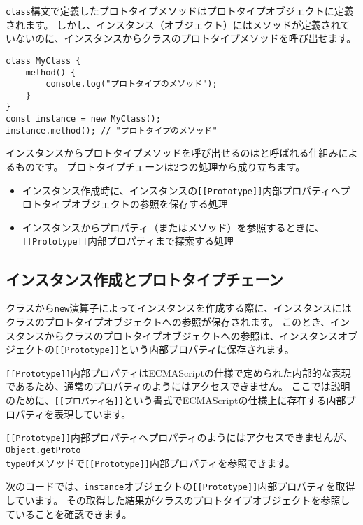 \texttt{class}構文で定義したプロトタイプメソッドはプロトタイプオブジェクトに定義されます。
しかし、インスタンス（オブジェクト）にはメソッドが定義されていないのに、インスタンスからクラスのプロトタイプメソッドを呼び出せます。

\begin{lstlisting}
class MyClass {
    method() {
        console.log("プロトタイプのメソッド");
    }
}
const instance = new MyClass();
instance.method(); // "プロトタイプのメソッド"
\end{lstlisting}

インスタンスからプロトタイプメソッドを呼び出せるのは\textbf{}と呼ばれる仕組みによるものです。
プロトタイプチェーンは2つの処理から成り立ちます。

\begin{itemize}
\item
  インスタンス作成時に、インスタンスの\texttt{[[Prototype]]}内部プロパティへプロトタイプオブジェクトの参照を保存する処理
\item
  インスタンスからプロパティ（またはメソッド）を参照するときに、\texttt{[[Prototype]]}内部プロパティまで探索する処理
\end{itemize}

\hypertarget{write-prototype-chain}{%
\subsection{インスタンス作成とプロトタイプチェーン}\label{write-prototype-chain}}

クラスから\texttt{new}演算子によってインスタンスを作成する際に、インスタンスにはクラスのプロトタイプオブジェクトへの参照が保存されます。
このとき、インスタンスからクラスのプロトタイプオブジェクトへの参照は、インスタンスオブジェクトの\texttt{[[Prototype]]}という内部プロパティに保存されます。

\texttt{[[Prototype]]}内部プロパティはECMAScriptの仕様で定められた内部的な表現であるため、通常のプロパティのようにはアクセスできません。
ここでは説明のために、\texttt{[[プロパティ名]]}という書式でECMAScriptの仕様上に存在する内部プロパティを表現しています。

\texttt{[[Prototype]]}内部プロパティへプロパティのようにはアクセスできませんが、\texttt{Object.getProto\\typeOf}メソッドで\texttt{[[Prototype]]}内部プロパティを参照できます。

次のコードでは、\texttt{instance}オブジェクトの\texttt{[[Prototype]]}内部プロパティを取得しています。
その取得した結果がクラスのプロトタイプオブジェクトを参照していることを確認できます。


